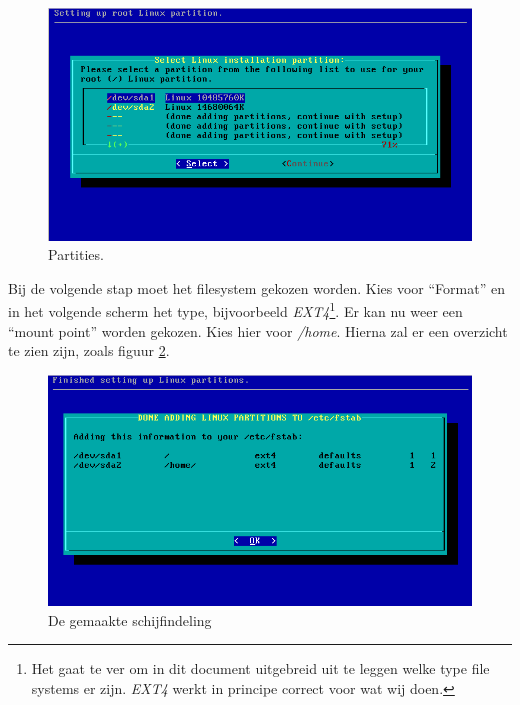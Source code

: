 \begin{figure}[H]
  \begin{center}
    \includegraphics[scale=0.5]{images/02_partition}
  \end{center}
  \caption{Partities.}
  \label{fig:partitie}
\end{figure}

Bij de volgende stap moet het filesystem gekozen worden. Kies voor ``Format'' en in het volgende scherm het type, bijvoorbeeld \emph{EXT4}\footnote{Het gaat te ver om in dit document uitgebreid uit te leggen welke type file systems er zijn. \emph{EXT4} werkt in principe correct voor wat wij doen.}. Er kan nu weer een ``mount point'' worden gekozen. Kies hier voor \emph{/home}. Hierna zal er een overzicht te zien zijn, zoals figuur \ref{fig:fstab}.

\begin{figure}[H]
  \begin{center}
    \includegraphics[scale=0.5]{images/03_fstab}
  \end{center}
  \caption{De gemaakte schijfindeling}
  \label{fig:fstab}
\end{figure}

